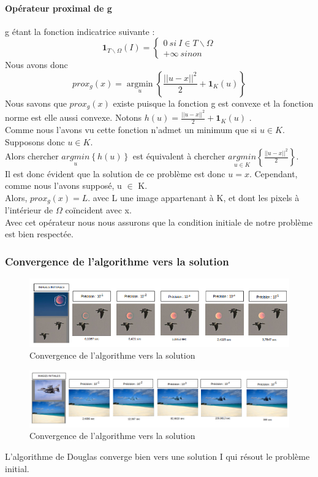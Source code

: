 \paragraph{Opérateur proximal de g}
g étant la fonction indicatrice suivante : 
\begin{equation*}
\mathbf{1}_{ T \backslash \Omega }(I) =
	\left\{
	\begin{aligned}{}
	0 \ si\  I \in T \backslash \Omega \\
	+ \infty \ sinon
    \end{aligned}
    \right.
\end{equation*}{}
Nous avons donc 
\begin{equation*}
prox_g(x) =  \operatorname*{argmin}_u\left\{\frac{||u-x||^2}{2}+ \mathbf{1}_K(u)\right\}
\end{equation*}
Nous savons que $prox_g(x)$ existe puisque la fonction g est convexe et la fonction norme est elle aussi convexe.\newline
Notons $h(u) = \frac{||u-x||^2}{2}+ \mathbf{1}_K(u)$ .\\
Comme nous l'avons vu cette fonction n'admet un minimum que si $u \in K$. Supposons donc $u \in K$.\\
 Alors chercher $\underset{u}{argmin}\left\{h(u)\right\}$ est équivalent à chercher $\underset{u \in K}{argmin} \left\{\frac{||u-x||^2}{2}\right\}$.\\
Il est donc évident que  la solution de ce problème est donc $u= x$. Cependant, comme nous l'avons supposé, u $\in $ K.\\ 
Alors, $prox_g(x) = L$.
avec L une image appartenant à K, et dont les pixels à l'intérieur de $\Omega$ coïncident avec x.\\ Avec cet opérateur nous nous assurons que la condition initiale de notre problème est bien respectée.
\subsubsection{Convergence de l'algorithme vers la solution}
\begin{figure}[!htb]
\includegraphics[scale=0.6]{Images/Resultats/conv1.png}
\caption{Convergence de l'algorithme vers la solution}
\end{figure}
\begin{figure}[!htb]
\includegraphics[scale=0.4]{Images/Resultats/conv2.png}
\caption{Convergence de l'algorithme vers la solution}
\end{figure}
L'algorithme de Douglas converge bien vers une solution I qui résout le problème initial.
